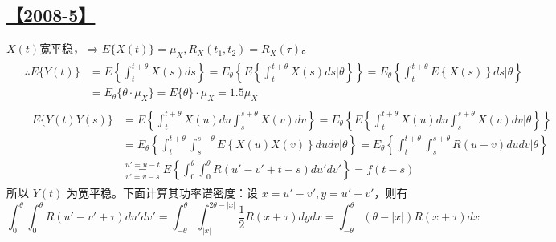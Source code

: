 \subsection{\hyperref[Q2008-5]{【2008-5】}}\label{A2008-5}

$X(t)$宽平稳，$\Rightarrow E\{X(t)\}=\mu_X, R_X(t_1, t_2)=R_X(\tau)$。
\begin{equation}\tag*{}\begin{split}
&\begin{split}\therefore E\{Y(t)\}&=E\left\{\int_t^{t+\theta}X(s)ds\right\}=E_\theta\left\{E\left\{\int_t^{t+\theta}X(s)ds\biggr\rvert\theta\right\}\right\}=E_\theta\left\{\int_t^{t+\theta}E
\left\{X(s)\right\}ds\biggr\rvert\theta\right\}\\
&=E_\theta\{\theta\cdot\mu_X\}=E\{\theta\}\cdot\mu_X=1.5\mu_X\end{split}\\
&\begin{split}\ \ \ E\{Y(t)Y(s)\}&=E\left\{\int_t^{t+\theta}X(u)du\int_s^{s+\theta}X(v)dv\right\}=E_\theta\left\{E\left\{\int_t^{t+\theta}X(u)du\int_s^{s+\theta}X(v)dv\biggr\rvert\theta\right\}\right\}\\
&=E_\theta\left\{\int_t^{t+\theta}\int_s^{s+\theta}E\left\{X(u)X(v)\right\}dudv\biggr\rvert\theta\right\}=E_\theta\left\{\int_t^{t+\theta}\int_s^{s+\theta}R(u-v)dudv\biggr\rvert\theta\right\}\\
&\overset{u'=u-t}{\underset{v'=v-s}{=}}E\left\{\int_0^\theta\int_0^\theta R(u'-v'+t-s)du'dv'\right\}=f(t-s)\end{split}
\end{split}
\end{equation}
所以 $Y(t)$ 为宽平稳。下面计算其功率谱密度：设 $x=u'-v', y=u'+v'$，则有
\begin{equation}\tag*{}
\int_0^\theta\int_0^\theta R(u'-v'+\tau)du'dv'=\int_{-\theta}^{\theta}\int_{|x|}^{2\theta-|x|}\frac{1}{2}R(x+\tau)dydx=\int_{-\theta}^{\theta}(\theta-|x|)R(x+\tau)dx
\end{equation}
